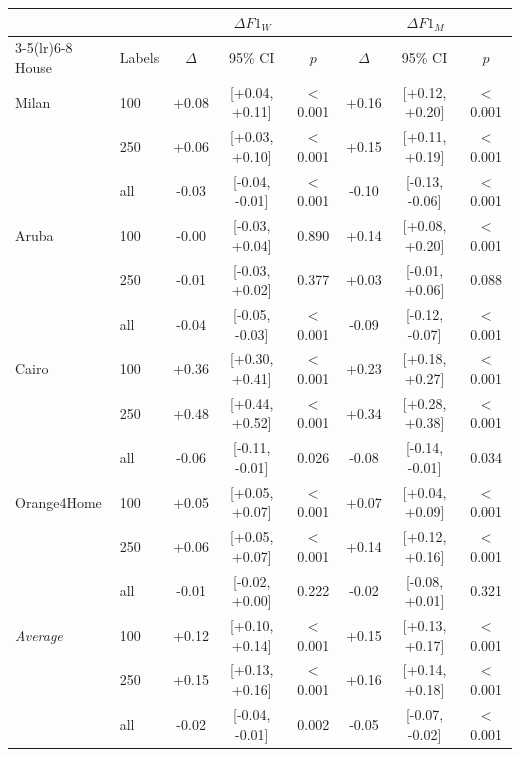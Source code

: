 \begin{tabular}{l l ccc ccc}
\toprule
 & & \multicolumn{3}{c}{$\Delta F1_W$} & \multicolumn{3}{c}{$\Delta F1_M$} \\
\cmidrule(lr){3-5}\cmidrule(lr){6-8}
House & Labels & $\Delta$ & 95\% CI & $p$ & $\Delta$ & 95\% CI & $p$ \\
\midrule
Milan & 100 & +0.08 & [+0.04, +0.11] & $<$0.001 & +0.16 & [+0.12, +0.20] & $<$0.001 \\
 & 250 & +0.06 & [+0.03, +0.10] & $<$0.001 & +0.15 & [+0.11, +0.19] & $<$0.001 \\
 & all & -0.03 & [-0.04, -0.01] & $<$0.001 & -0.10 & [-0.13, -0.06] & $<$0.001 \\
\midrule
Aruba & 100 & -0.00 & [-0.03, +0.04] & 0.890 & +0.14 & [+0.08, +0.20] & $<$0.001 \\
 & 250 & -0.01 & [-0.03, +0.02] & 0.377 & +0.03 & [-0.01, +0.06] & 0.088 \\
 & all & -0.04 & [-0.05, -0.03] & $<$0.001 & -0.09 & [-0.12, -0.07] & $<$0.001 \\
\midrule
Cairo & 100 & +0.36 & [+0.30, +0.41] & $<$0.001 & +0.23 & [+0.18, +0.27] & $<$0.001 \\
 & 250 & +0.48 & [+0.44, +0.52] & $<$0.001 & +0.34 & [+0.28, +0.38] & $<$0.001 \\
 & all & -0.06 & [-0.11, -0.01] & 0.026 & -0.08 & [-0.14, -0.01] & 0.034 \\
\midrule
Orange4Home & 100 & +0.05 & [+0.05, +0.07] & $<$0.001 & +0.07 & [+0.04, +0.09] & $<$0.001 \\
 & 250 & +0.06 & [+0.05, +0.07] & $<$0.001 & +0.14 & [+0.12, +0.16] & $<$0.001 \\
 & all & -0.01 & [-0.02, +0.00] & 0.222 & -0.02 & [-0.08, +0.01] & 0.321 \\
\midrule
\textit{Average} & 100 & +0.12 & [+0.10, +0.14] & $<$0.001 & +0.15 & [+0.13, +0.17] & $<$0.001 \\
 & 250 & +0.15 & [+0.13, +0.16] & $<$0.001 & +0.16 & [+0.14, +0.18] & $<$0.001 \\
 & all & -0.02 & [-0.04, -0.01] & 0.002 & -0.05 & [-0.07, -0.02] & $<$0.001 \\
\bottomrule
\end{tabular}
